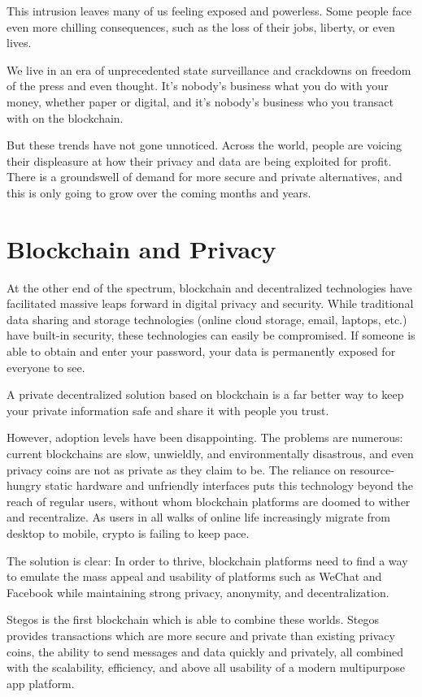 \documentclass[8pt,fleqn,openany]{book}
\begin{document}
This intrusion leaves many of us feeling exposed and powerless. Some people face even more chilling consequences, such as the loss of their jobs, liberty, or even lives. 

We live in an era of unprecedented state surveillance and crackdowns on freedom of the press and even thought. It’s nobody’s business what you do with your money, whether paper or digital, and it’s nobody's business who you transact with on the blockchain.

But these trends have not gone unnoticed. Across the world, people are voicing their displeasure at how their privacy and data are being exploited for profit. There is a groundswell of demand for more secure and private alternatives, and this is only going to grow over the coming months and years.

\section{Blockchain and Privacy}
At the other end of the spectrum, blockchain and decentralized technologies have facilitated massive leaps forward in digital privacy and security. While traditional data sharing and storage technologies (online cloud storage, email, laptops, etc.) have built-in security, these technologies can easily be compromised. If someone is able to obtain and enter your password, your data is permanently exposed for everyone to see.

A private decentralized solution based on blockchain is a far better way to keep your private information safe and share it with people you trust.

However, adoption levels have been disappointing. The problems are numerous: current blockchains are slow, unwieldly, and environmentally disastrous, and even privacy coins are not as private as they claim to be. The reliance on resource-hungry static hardware and unfriendly interfaces puts this technology beyond the reach of regular users, without whom blockchain platforms are doomed to wither and recentralize. As users in all walks of online life increasingly migrate from desktop to mobile, crypto is failing to keep pace. 

The solution is clear: In order to thrive, blockchain platforms need to find a way to emulate the mass appeal and usability of platforms such as WeChat and Facebook while maintaining strong privacy, anonymity, and decentralization.

Stegos is the first blockchain which is able to combine these worlds. Stegos provides transactions which are more secure and private than existing privacy coins, the ability to send messages and data quickly and privately, all combined with the scalability, efficiency, and above all usability of a modern multipurpose app platform.    
\end{document}
